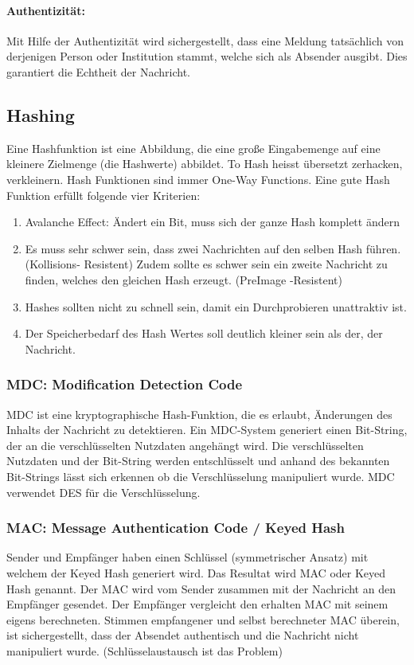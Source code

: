 \paragraph{Authentizität:} Mit Hilfe der Authentizität wird sichergestellt, dass eine Meldung tatsächlich von derjenigen Person
oder Institution stammt, welche sich als Absender ausgibt. Dies garantiert die Echtheit der Nachricht. 

\subsection{Hashing}
Eine Hashfunktion ist eine Abbildung, die eine große Eingabemenge auf eine kleinere Zielmenge (die Hashwerte) abbildet. To Hash heisst übersetzt zerhacken, verkleinern. Hash Funktionen sind immer One-Way Functions. Eine gute Hash Funktion erfüllt folgende vier Kriterien:
\begin{enumerate}
	\item Avalanche Effect: Ändert ein Bit, muss sich der ganze Hash komplett ändern
	\item Es muss sehr schwer sein, dass zwei Nachrichten auf den selben Hash führen. (Kollisions- Resistent) Zudem sollte es schwer sein ein zweite Nachricht zu finden, welches den gleichen Hash erzeugt.  (PreImage -Resistent)
	\item Hashes sollten nicht zu schnell sein, damit ein Durchprobieren unattraktiv ist.
	\item Der Speicherbedarf des Hash Wertes soll deutlich kleiner sein als der, der Nachricht. 
\end{enumerate}

\subsubsection{MDC: Modification Detection Code}
MDC ist eine kryptographische Hash-Funktion, die es erlaubt, Änderungen des Inhalts der Nachricht zu detektieren. Ein MDC-System generiert einen Bit-String, der an die verschlüsselten Nutzdaten angehängt wird. Die verschlüsselten Nutzdaten und der Bit-String werden entschlüsselt und anhand des bekannten Bit-Strings lässt sich erkennen ob die Verschlüsselung manipuliert wurde. MDC verwendet DES für die Verschlüsselung.

\subsubsection{MAC: Message Authentication Code / Keyed Hash}
Sender und Empfänger haben einen Schlüssel (symmetrischer Ansatz) mit welchem der Keyed Hash generiert wird. Das Resultat wird MAC oder Keyed Hash genannt. Der MAC wird vom Sender zusammen mit der Nachricht an den Empfänger gesendet. Der Empfänger vergleicht den erhalten MAC mit seinem eigens berechneten. Stimmen empfangener und selbst berechneter MAC überein, ist sichergestellt, dass der Absendet authentisch und die Nachricht nicht manipuliert wurde. (Schlüsselaustausch ist das Problem)

